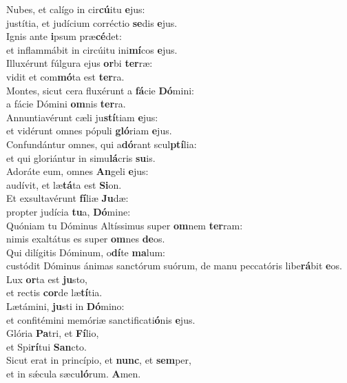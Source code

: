 \evenverse Nubes, et calígo in cir\textbf{cú}itu \textbf{e}jus:~\*\\
\evenverse justítia, et judícium corréctio \textbf{se}dis \textbf{e}jus.\\
\oddverse Ignis ante \textbf{i}psum præ\textbf{cé}det:~\*\\
\oddverse et inflammábit in circúitu ini\textbf{mí}cos \textbf{e}jus.\\
\evenverse Illuxérunt fúlgura ejus \textbf{or}bi \textbf{ter}ræ:~\*\\
\evenverse vidit et com\textbf{mó}ta est \textbf{ter}ra.\\
\oddverse Montes, sicut cera fluxérunt a \textbf{fá}cie \textbf{Dó}mini:~\*\\
\oddverse a fácie Dómini \textbf{om}nis \textbf{ter}ra.\\
\evenverse Annuntiavérunt cæli ju\textbf{stí}tiam \textbf{e}jus:~\*\\
\evenverse et vidérunt omnes pópuli \textbf{gló}riam \textbf{e}jus.\\
\oddverse Confundántur omnes, qui a\textbf{dó}rant scul\textbf{ptí}lia:~\*\\
\oddverse et qui gloriántur in simu\textbf{lá}cris \textbf{su}is.\\
\evenverse Adoráte eum, omnes \textbf{An}geli \textbf{e}jus:~\*\\
\evenverse audívit, et læ\textbf{tá}ta est \textbf{Si}on.\\
\oddverse Et exsultavérunt \textbf{fí}liæ \textbf{Ju}dæ:~\*\\
\oddverse propter judícia \textbf{tu}a, \textbf{Dó}mine:\\
\evenverse Quóniam tu Dóminus Altíssimus super \textbf{om}nem \textbf{ter}ram:~\*\\
\evenverse nimis exaltátus es super \textbf{om}nes \textbf{de}os.\\
\oddverse Qui dilígitis Dóminum, o\textbf{dí}te \textbf{ma}lum:~\*\\
\oddverse custódit Dóminus ánimas sanctórum suórum, de manu peccatóris libe\textbf{rá}bit \textbf{e}os.\\
\evenverse Lux \textbf{or}ta est \textbf{ju}sto,~\*\\
\evenverse et rectis \textbf{cor}de læ\textbf{tí}tia.\\
\oddverse Lætámini, \textbf{ju}sti in \textbf{Dó}mino:~\*\\
\oddverse et confitémini memóriæ sanctificati\textbf{ó}nis \textbf{e}jus.\\
\evenverse Glória \textbf{Pa}tri, et \textbf{Fí}lio,~\*\\
\evenverse et Spi\textbf{rí}tui \textbf{San}cto.\\
\oddverse Sicut erat in princípio, et \textbf{nunc}, et \textbf{sem}per,~\*\\
\oddverse et in sǽcula sæcu\textbf{ló}rum. \textbf{A}men.\\
